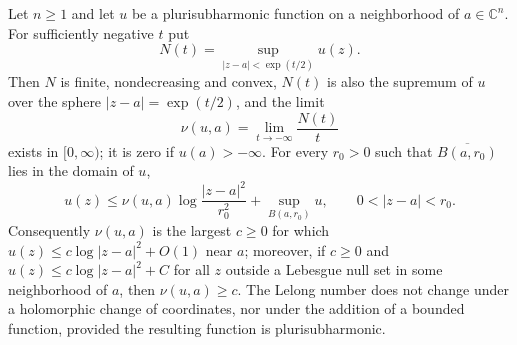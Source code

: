 \begin{proposition}\label{prop:lelong-logarithmic-growth}
Let $n\geq1$ and let $u$ be a plurisubharmonic function on a neighborhood of $a\in\mathbb C^n$. For sufficiently negative $t$ put
\[
 N(t)=\sup_{|z-a|<\exp(t/2)}u(z).
\]
Then $N$ is finite, nondecreasing and convex, $N(t)$ is also the supremum of $u$ over the sphere $|z-a|=\exp(t/2)$, and the limit
\begin{equation}\label{eq:lelong-growth-definition}
 \nu(u,a)=\lim_{t\to-\infty}\frac{N(t)}{t}
\end{equation}
exists in $[0,\infty)$; it is zero if $u(a)>-\infty$. For every $r_0>0$ such that $\overline{B(a,r_0)}$ lies in the domain of $u$,
\begin{equation}\label{eq:lelong-attained-growth}
 u(z)\leq\nu(u,a)\log\frac{|z-a|^2}{r_0^2}
                +\sup_{B(a,r_0)}u,\qquad 0<|z-a|<r_0.
\end{equation}
Consequently $\nu(u,a)$ is the largest $c\geq0$ for which $u(z)\leq c\log|z-a|^2+O(1)$ near $a$; moreover, if $c\geq0$ and $u(z)\leq c\log|z-a|^2+C$ for all $z$ outside a Lebesgue null set in some neighborhood of $a$, then $\nu(u,a)\geq c$. The Lelong number does not change under a holomorphic change of coordinates, nor under the addition of a bounded function, provided the resulting function is plurisubharmonic.
\end{proposition}
